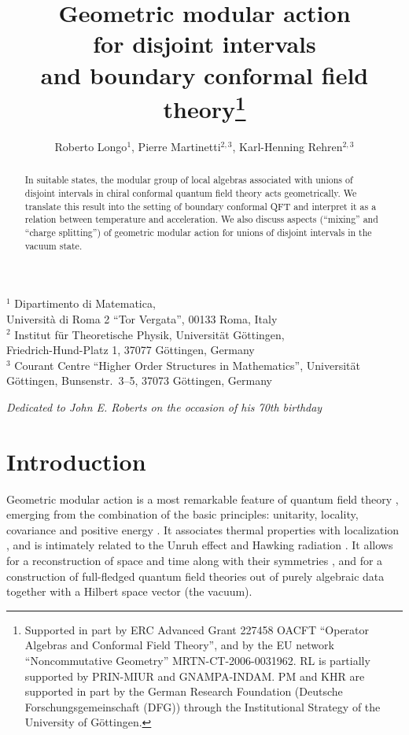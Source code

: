 \documentclass[12pt]{article}
\title{\bf Geometric modular action \\ for disjoint intervals \\ and boundary conformal field theory\footnote{Supported in part by ERC Advanced Grant 227458
  OACFT ``Operator Algebras and Conformal Field Theory'', and by the
  EU network ``Noncommutative Geometry'' MRTN-CT-2006-0031962. RL is
  partially supported by PRIN-MIUR and GNAMPA-INDAM. PM and KHR
  are supported in part by the German Research Foundation (Deutsche
  Forschungsgemeinschaft (DFG)) through the Institutional Strategy of
  the University of G\"ottingen.}}
\author{Roberto Longo$^{1}$, 
Pierre Martinetti$^{2,3}$, 
Karl-Henning Rehren$^{2,3}$}
\begin{document}
\maketitle

\begin{center}
\footnotesize
$^{1}$ Dipartimento di Matematica, \\
Universit\`a di Roma 2 ``Tor Vergata'', 00133 Roma, Italy \\[2mm]
$^2$ Institut f\"ur Theoretische Physik, Universit\"at G\"ottingen, \\
Friedrich-Hund-Platz 1, 37077 G\"ottingen, Germany \\[2mm]
$^3$ Courant Centre ``Higher Order Structures in Mathematics'',
  Universit\"at G\"ottingen, Bunsenstr.\ 3--5, 37073 G\"ottingen, Germany
\end{center}

\begin{abstract}
In suitable states, the modular group of local algebras associated
with unions of disjoint intervals in chiral conformal quantum field
theory acts geometrically. We translate this result into the setting
of boundary conformal QFT and interpret it as a relation between
temperature and acceleration. We also discuss aspects (``mixing'' and
``charge splitting'') of geometric
modular action for unions of disjoint intervals in the vacuum state.
\end{abstract}


\medskip

{\sl Dedicated to John E. Roberts on the occasion of his 70th birthday}



\section{Introduction}
Geometric modular action is a most remarkable feature of quantum field
theory \cite{Bo}, emerging from the combination of the basic
principles: unitarity, locality, covariance and positive energy
\cite{BW}. It associates thermal properties with localization
\cite{HHW,SW}, and is intimately related to the Unruh effect \cite{U}
and Hawking radiation \cite{S}.  It allows for a reconstruction of
space and time along with their symmetries \cite{BS}, and for a
construction of full-fledged quantum field theories \cite{KW,GLW}
out of purely algebraic data together with a Hilbert space vector (the
vacuum).  
\end{document}
